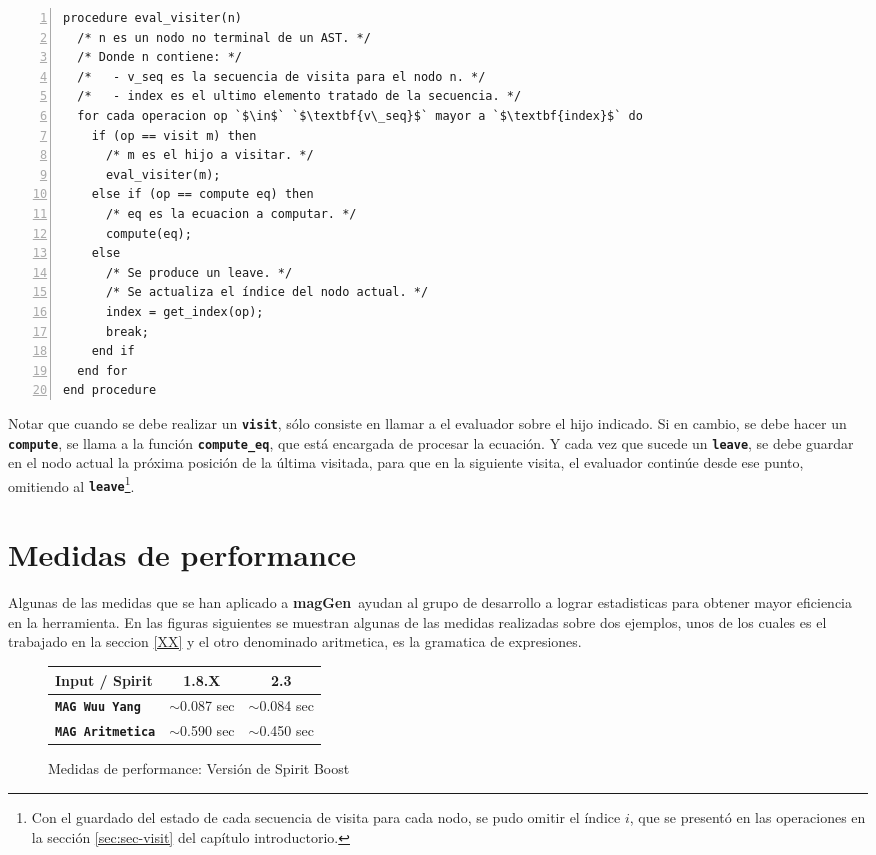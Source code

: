 \documentclass[runningheads,a4paper]{llncs}
\newcommand{\textbtt}[1]{\texttt{\textbf{#1}}}
\newcommand{\maggen}{\textbf{magGen}}
\begin{document}
\begin{lstlisting}[numbers=left]
procedure eval_visiter(n)
  /* n es un nodo no terminal de un AST. */
  /* Donde n contiene: */
  /*   - v_seq es la secuencia de visita para el nodo n. */
  /*   - index es el ultimo elemento tratado de la secuencia. */
  for cada operacion op `$\in$` `$\textbf{v\_seq}$` mayor a `$\textbf{index}$` do
    if (op == visit m) then
      /* m es el hijo a visitar. */
      eval_visiter(m);
    else if (op == compute eq) then
      /* eq es la ecuacion a computar. */
      compute(eq);
    else
      /* Se produce un leave. */
      /* Se actualiza el índice del nodo actual. */
      index = get_index(op);
      break;
    end if
  end for
end procedure
\end{lstlisting}

Notar que cuando se debe realizar un \textbtt{visit}, sólo consiste en llamar a el evaluador sobre el hijo indicado. Si en cambio, se debe hacer un \textbtt{compute}, se llama a la función \textbtt{compute\_eq}, que está encargada de procesar la ecuación. Y cada vez que sucede un \textbtt{leave}, se debe guardar en el nodo actual la próxima posición de la última visitada, para que en la siguiente visita, el evaluador continúe desde ese punto, omitiendo al \textbtt{leave}\footnote{Con el guardado del estado de cada secuencia de visita para cada nodo, se pudo omitir el índice $i$, que se presentó en las operaciones en la sección \ref{sec:sec-visit} del capítulo introductorio.}.


\section{Medidas de performance}
Algunas de las medidas que se han aplicado a \maggen\ ayudan al grupo de desarrollo a lograr estadisticas para obtener mayor eficiencia en la herramienta.
En las figuras siguientes se muestran algunas de las medidas realizadas sobre dos ejemplos, unos de los cuales es el trabajado en la seccion \ref{XX} y el otro denominado aritmetica, es la gramatica de expresiones.

\begin{figure}[h]
        \begin{center}
        \setlength{\doublerulesep}{0mm}
        \setlength{\arrayrulewidth}{0.9pt}
        \begin{tabular}{|l||c|c|}
            \hline
            \rowcolor{gris} Input / Spirit           & \textbf{1.8.X}   & \textbf{2.3}   \\ \hline
            \rowcolor{white}\textbtt{MAG Wuu Yang}   & $\sim$0.087 sec & $\sim$0.084 sec \\ \hline
            \rowcolor{white}\textbtt{MAG Aritmetica} & $\sim$0.590 sec & $\sim$0.450 sec \\ \hline
        \end{tabular}
        \end{center}
\caption{Medidas de performance: Versión de Spirit Boost}
\end{figure}
\end{document}
